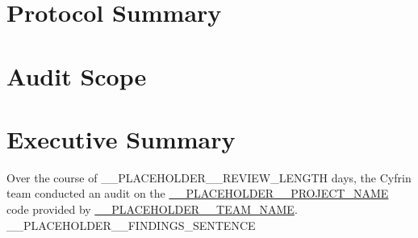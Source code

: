 \newcommand{\truncatehash}[1]{%
  \StrLeft{#1}{12}\ldots%
}

\hypertarget{protocol-summary}{%
\section{Protocol Summary}\label{protocol-summary}}



\hypertarget{audit-scope}{%
\section{Audit Scope}\label{audit-scope}}



\hypertarget{executive-summary}{%
\section{Executive Summary}\label{executive-summary}}

Over the course of __PLACEHOLDER__REVIEW_LENGTH days, the Cyfrin team conducted an audit on the
\href{__PLACEHOLDER__REPO_LINK}{__PLACEHOLDER__PROJECT_NAME}
code provided by
\href{__PLACEHOLDER__TEAM_WEBSITE}{__PLACEHOLDER__TEAM_NAME}.
__PLACEHOLDER__FINDINGS_SENTENCE
\bigbreak


\vspace{1cm}

\renewcommand{\floatpagefraction}{.8}%
\renewcommand{\textfraction}{.1}%
\renewcommand{\topfraction}{.9}%
\renewcommand{\bottomfraction}{.9}%
\setcounter{topnumber}{2}
\setcounter{bottomnumber}{2}
\setcounter{totalnumber}{4}

